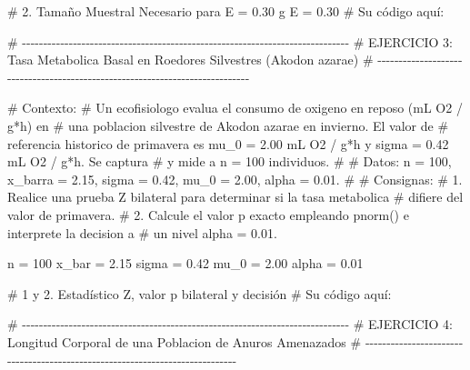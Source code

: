 \documentclass[
  spanish,
  letterpaper,
  DIV=11,
  numbers=noendperiod]{scrreprt}
\newenvironment{Shaded}{\begin{snugshade}}{\end{snugshade}}
\newcommand{\CommentTok}[1]{\textcolor[rgb]{0.37,0.37,0.37}{#1}}
\newcommand{\DecValTok}[1]{\textcolor[rgb]{0.68,0.00,0.00}{#1}}
\newcommand{\FloatTok}[1]{\textcolor[rgb]{0.68,0.00,0.00}{#1}}
\newcommand{\NormalTok}[1]{\textcolor[rgb]{0.00,0.23,0.31}{#1}}
\newcommand{\OtherTok}[1]{\textcolor[rgb]{0.00,0.23,0.31}{#1}}
\begin{document}
\begin{Shaded}
\begin{Highlighting}[]
\CommentTok{\# 2. Tamaño Muestral Necesario para E = 0.30 g}
\NormalTok{E }\OtherTok{=} \FloatTok{0.30}
\CommentTok{\# Su código aquí:}



\CommentTok{\# {-}{-}{-}{-}{-}{-}{-}{-}{-}{-}{-}{-}{-}{-}{-}{-}{-}{-}{-}{-}{-}{-}{-}{-}{-}{-}{-}{-}{-}{-}{-}{-}{-}{-}{-}{-}{-}{-}{-}{-}{-}{-}{-}{-}{-}{-}{-}{-}{-}{-}{-}{-}{-}{-}{-}{-}{-}{-}{-}{-}{-}{-}{-}{-}{-}{-}{-}{-}{-}{-}{-}{-}{-}{-}{-}{-}{-}}
\CommentTok{\# EJERCICIO 3: Tasa Metabolica Basal en Roedores Silvestres (Akodon azarae)}
\CommentTok{\# {-}{-}{-}{-}{-}{-}{-}{-}{-}{-}{-}{-}{-}{-}{-}{-}{-}{-}{-}{-}{-}{-}{-}{-}{-}{-}{-}{-}{-}{-}{-}{-}{-}{-}{-}{-}{-}{-}{-}{-}{-}{-}{-}{-}{-}{-}{-}{-}{-}{-}{-}{-}{-}{-}{-}{-}{-}{-}{-}{-}{-}{-}{-}{-}{-}{-}{-}{-}{-}{-}{-}{-}{-}{-}{-}{-}{-}}

\CommentTok{\# Contexto:}
\CommentTok{\# Un ecofisiologo evalua el consumo de oxigeno en reposo (mL O2 / g*h) en}
\CommentTok{\# una poblacion silvestre de Akodon azarae en invierno. El valor de}
\CommentTok{\# referencia historico de primavera es mu\_0 = 2.00 mL O2 / g*h y sigma = 0.42 mL O2 / g*h. Se captura}
\CommentTok{\# y mide a n = 100 individuos.}
\CommentTok{\#}
\CommentTok{\# Datos: n = 100, x\_barra = 2.15, sigma = 0.42, mu\_0 = 2.00, alpha = 0.01.}
\CommentTok{\#}
\CommentTok{\# Consignas:}
\CommentTok{\# 1. Realice una prueba Z bilateral para determinar si la tasa metabolica}
\CommentTok{\#    difiere del valor de primavera.}
\CommentTok{\# 2. Calcule el valor p exacto empleando pnorm() e interprete la decision a}
\CommentTok{\#    un nivel alpha = 0.01.}

\NormalTok{n }\OtherTok{=} \DecValTok{100}
\NormalTok{x\_bar }\OtherTok{=} \FloatTok{2.15}
\NormalTok{sigma }\OtherTok{=} \FloatTok{0.42}
\NormalTok{mu\_0 }\OtherTok{=} \FloatTok{2.00}
\NormalTok{alpha }\OtherTok{=} \FloatTok{0.01}

\CommentTok{\# 1 y 2. Estadístico Z, valor p bilateral y decisión}
\CommentTok{\# Su código aquí:}



\CommentTok{\# {-}{-}{-}{-}{-}{-}{-}{-}{-}{-}{-}{-}{-}{-}{-}{-}{-}{-}{-}{-}{-}{-}{-}{-}{-}{-}{-}{-}{-}{-}{-}{-}{-}{-}{-}{-}{-}{-}{-}{-}{-}{-}{-}{-}{-}{-}{-}{-}{-}{-}{-}{-}{-}{-}{-}{-}{-}{-}{-}{-}{-}{-}{-}{-}{-}{-}{-}{-}{-}{-}{-}{-}{-}{-}{-}{-}{-}}
\CommentTok{\# EJERCICIO 4: Longitud Corporal de una Poblacion de Anuros Amenazados}
\CommentTok{\# {-}{-}{-}{-}{-}{-}{-}{-}{-}{-}{-}{-}{-}{-}{-}{-}{-}{-}{-}{-}{-}{-}{-}{-}{-}{-}{-}{-}{-}{-}{-}{-}{-}{-}{-}{-}{-}{-}{-}{-}{-}{-}{-}{-}{-}{-}{-}{-}{-}{-}{-}{-}{-}{-}{-}{-}{-}{-}{-}{-}{-}{-}{-}{-}{-}{-}{-}{-}{-}{-}{-}{-}{-}{-}{-}{-}{-}}


\end{Highlighting}
\end{Shaded}
\end{document}

